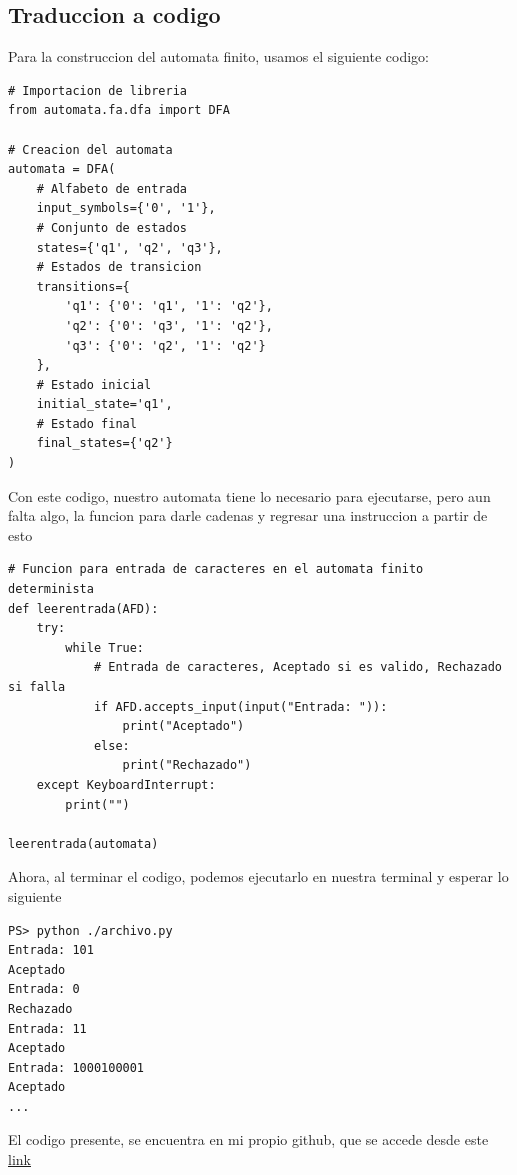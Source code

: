 \documentclass{article}
\begin{document}
        \subsection{Traduccion a codigo}
        Para la construccion del automata finito, usamos el siguiente codigo: 
\begin{lstlisting}
# Importacion de libreria
from automata.fa.dfa import DFA

# Creacion del automata
automata = DFA(
    # Alfabeto de entrada
    input_symbols={'0', '1'},
    # Conjunto de estados
    states={'q1', 'q2', 'q3'},
    # Estados de transicion
    transitions={
        'q1': {'0': 'q1', '1': 'q2'},
        'q2': {'0': 'q3', '1': 'q2'},
        'q3': {'0': 'q2', '1': 'q2'}
    },
    # Estado inicial
    initial_state='q1',
    # Estado final
    final_states={'q2'}
)
\end{lstlisting}
\newpage
Con este codigo, nuestro automata tiene lo necesario para ejecutarse, pero aun falta algo, la funcion para darle cadenas y regresar una instruccion a partir de esto

\begin{lstlisting}
# Funcion para entrada de caracteres en el automata finito determinista
def leerentrada(AFD):
    try:
        while True:
            # Entrada de caracteres, Aceptado si es valido, Rechazado si falla
            if AFD.accepts_input(input("Entrada: ")):
                print("Aceptado")
            else:
                print("Rechazado")
    except KeyboardInterrupt:
        print("")

leerentrada(automata)
\end{lstlisting}

Ahora, al terminar el codigo, podemos ejecutarlo en nuestra terminal y esperar lo siguiente


\begin{lstlisting}
PS> python ./archivo.py
Entrada: 101
Aceptado
Entrada: 0
Rechazado
Entrada: 11
Aceptado
Entrada: 1000100001 
Aceptado
...
\end{lstlisting}
El codigo presente, se encuentra en mi propio github, que se accede desde este \href{https://github.com/Andres0w/AutomatasyCompiladores/blob/57a76e46991fa29000858bb3f86df95643f891f0/Practica3/automata.py}{link}
\end{document}
